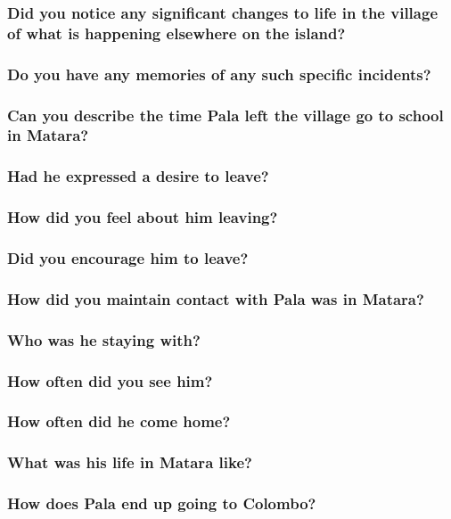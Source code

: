 \documentclass[11pt]{article}
\begin{document}
\subsubsection{Did you notice any significant changes to life in the village of what is happening elsewhere on the island?}
\label{sec:org5508a3d}
\subsubsection{Do you have any memories of any such specific incidents?}
\label{sec:org56cbc3b}
\subsubsection{Can you describe the time Pala left the village go to school in Matara?}
\label{sec:orge17e6bc}
\subsubsection{Had he expressed a desire to leave?}
\label{sec:org4257e96}
\subsubsection{How did you feel about him leaving?}
\label{sec:org16bf2f2}
\subsubsection{Did you encourage him to leave?}
\label{sec:orga5cee26}
\subsubsection{How did you maintain contact with Pala was in Matara?}
\label{sec:orge479a53}
\subsubsection{Who was he staying with?}
\label{sec:org8d2b239}
\subsubsection{How often did you see him?}
\label{sec:org8e7d8f7}
\subsubsection{How often did he come home?}
\label{sec:orgf6581f5}
\subsubsection{What was his life in Matara like?}
\label{sec:org6f64faa}
\subsubsection{How does Pala end up going to Colombo?}
\label{sec:org14a2992}
\end{document}
